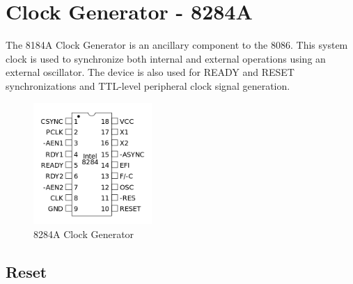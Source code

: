 \newpage
\section{Clock Generator - 8284A}
The 8184A Clock Generator is an ancillary component to the 8086. This system clock is used to synchronize both internal and external operations using an external oscillator. The device is also used for READY and RESET synchronizations and TTL-level peripheral clock signal generation.

        \begin{figure}[h]
            \begin{center}
                \includegraphics[width=0.4\textwidth]{figures/8284a.png}
                \caption{8284A Clock Generator} \label{fig:8284a}
            \end{center}
        \end{figure}

    \subsection{Reset}